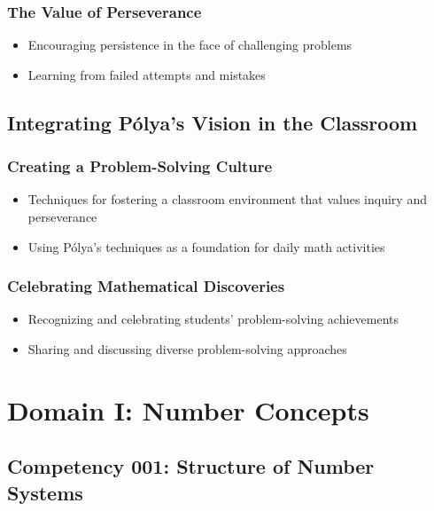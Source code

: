 \documentclass{book}
\begin{document}
\subsection{The Value of Perseverance}
\begin{itemize}
        \item Encouraging persistence in the face of challenging problems
        \item Learning from failed attempts and mistakes
\end{itemize}


\section{Integrating Pólya's Vision in the Classroom}
\subsection{Creating a Problem-Solving Culture}
\begin{itemize}
        \item Techniques for fostering a classroom environment that values inquiry and perseverance
        \item Using Pólya's techniques as a foundation for daily math activities
\end{itemize}
\subsection{Celebrating Mathematical Discoveries}
\begin{itemize}
        \item Recognizing and celebrating students' problem-solving achievements
        \item Sharing and discussing diverse problem-solving approaches
\end{itemize}






\chapter{Domain I: Number Concepts}

\section{Competency 001: Structure of Number Systems}
\end{document}
